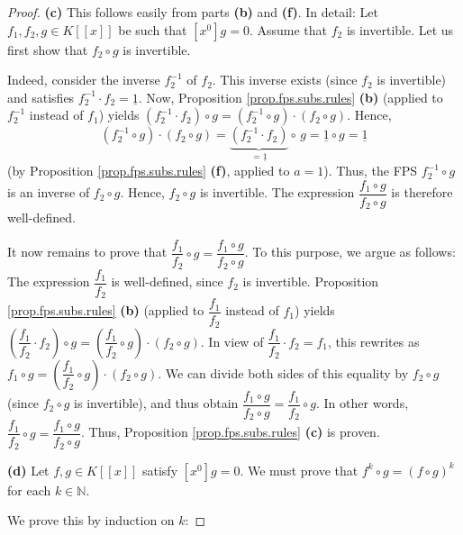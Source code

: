 \begin{proof}
\bigskip

\textbf{(c)} This follows easily from parts \textbf{(b)} and \textbf{(f)}. In
detail: Let $f_{1},f_{2},g\in K\left[  \left[  x\right]  \right]  $ be such
that $\left[  x^{0}\right]  g=0$. Assume that $f_{2}$ is invertible. Let us
first show that $f_{2}\circ g$ is invertible.

Indeed, consider the inverse $f_{2}^{-1}$ of $f_{2}$. This inverse exists
(since $f_{2}$ is invertible) and satisfies $f_{2}^{-1}\cdot f_{2}%
=\underline{1}$. Now, Proposition \ref{prop.fps.subs.rules} \textbf{(b)}
(applied to $f_{2}^{-1}$ instead of $f_{1}$) yields $\left(  f_{2}^{-1}\cdot
f_{2}\right)  \circ g=\left(  f_{2}^{-1}\circ g\right)  \cdot\left(
f_{2}\circ g\right)  $. Hence,%
\[
\left(  f_{2}^{-1}\circ g\right)  \cdot\left(  f_{2}\circ g\right)
=\underbrace{\left(  f_{2}^{-1}\cdot f_{2}\right)  }_{=\underline{1}}%
\circ\,g=\underline{1}\circ g=\underline{1}%
\]
(by Proposition \ref{prop.fps.subs.rules} \textbf{(f)}, applied to $a=1$).
Thus, the FPS $f_{2}^{-1}\circ g$ is an inverse of $f_{2}\circ g$. Hence,
$f_{2}\circ g$ is invertible. The expression $\dfrac{f_{1}\circ g}{f_{2}\circ
g}$ is therefore well-defined.

It now remains to prove that $\dfrac{f_{1}}{f_{2}}\circ g=\dfrac{f_{1}\circ
g}{f_{2}\circ g}$. To this purpose, we argue as follows: The expression
$\dfrac{f_{1}}{f_{2}}$ is well-defined, since $f_{2}$ is invertible.
Proposition \ref{prop.fps.subs.rules} \textbf{(b)} (applied to $\dfrac{f_{1}%
}{f_{2}}$ instead of $f_{1}$) yields $\left(  \dfrac{f_{1}}{f_{2}}\cdot
f_{2}\right)  \circ g=\left(  \dfrac{f_{1}}{f_{2}}\circ g\right)  \cdot\left(
f_{2}\circ g\right)  $. In view of $\dfrac{f_{1}}{f_{2}}\cdot f_{2}=f_{1}$,
this rewrites as $f_{1}\circ g=\left(  \dfrac{f_{1}}{f_{2}}\circ g\right)
\cdot\left(  f_{2}\circ g\right)  $. We can divide both sides of this equality
by $f_{2}\circ g$ (since $f_{2}\circ g$ is invertible), and thus obtain
$\dfrac{f_{1}\circ g}{f_{2}\circ g}=\dfrac{f_{1}}{f_{2}}\circ g$. In other
words, $\dfrac{f_{1}}{f_{2}}\circ g=\dfrac{f_{1}\circ g}{f_{2}\circ g}$. Thus,
Proposition \ref{prop.fps.subs.rules} \textbf{(c)} is proven.

\bigskip

\textbf{(d)} Let $f,g\in K\left[  \left[  x\right]  \right]  $ satisfy
$\left[  x^{0}\right]  g=0$. We must prove that $f^{k}\circ g=\left(  f\circ
g\right)  ^{k}$ for each $k\in\mathbb{N}$.

We prove this by induction on $k$:


\end{proof}
